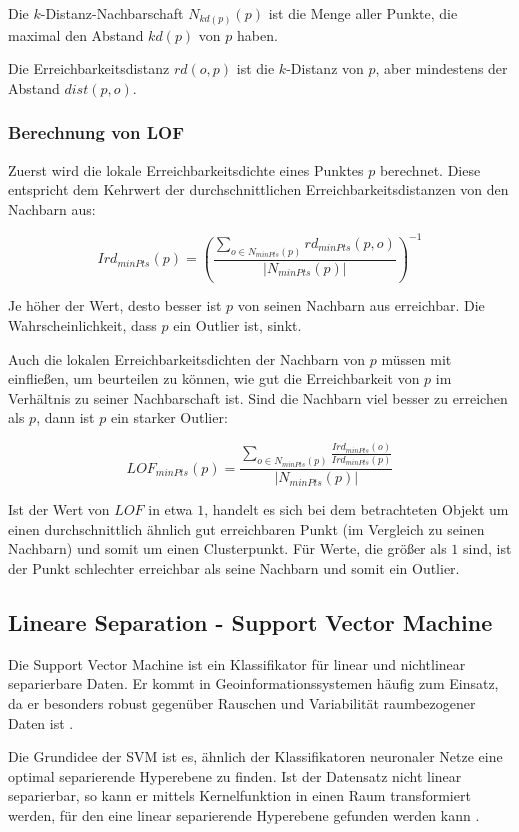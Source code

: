 \documentclass[11pt,ceqn]{book}
\begin{document}
Die $k$-Distanz-Nachbarschaft $N_{kd(p)} (p)$ ist die Menge aller Punkte, die maximal den Abstand $kd(p)$ von $p$ haben.

Die Erreichbarkeitsdistanz $rd(o,p)$ ist die $k$-Distanz von $p$, aber mindestens der Abstand $dist(p,o)$.

\subsubsection{Berechnung von LOF}

Zuerst wird die lokale Erreichbarkeitsdichte eines Punktes $p$ berechnet. Diese entspricht dem Kehrwert der durchschnittlichen Erreichbarkeitsdistanzen von den Nachbarn aus:

$$Ird_{minPts}(p) = \left(\frac{\sum\limits_{o \in N_{minPts}(p)} rd_{minPts}(p,o)}{|N_{minPts}(p)|}\right)^{-1}$$

Je höher der Wert, desto besser ist $p$ von seinen Nachbarn aus erreichbar. Die Wahrscheinlichkeit, dass $p$ ein Outlier ist, sinkt.

Auch die lokalen Erreichbarkeitsdichten der Nachbarn von $p$ müssen mit einfließen, um beurteilen zu können, wie gut die Erreichbarkeit von $p$ im Verhältnis zu seiner Nachbarschaft ist. Sind die Nachbarn viel besser zu erreichen als $p$, dann ist $p$ ein starker Outlier:

$$LOF_{minPts}(p) = \frac{\sum\limits_{o \in N_{minPts}(p)}\frac{Ird_{minPts}(o)}{Ird_{minPts}(p)}}{|N_{minPts}(p)|}$$

Ist der Wert von $LOF$ in etwa $1$, handelt es sich bei dem betrachteten Objekt um einen durchschnittlich ähnlich gut erreichbaren Punkt (im Vergleich zu seinen Nachbarn) und somit um einen Clusterpunkt. Für Werte, die größer als $1$ sind, ist der Punkt schlechter erreichbar als seine Nachbarn und somit ein Outlier.

\subsection{Lineare Separation - Support Vector Machine}
Die Support Vector Machine ist ein Klassifikator für linear und nichtlinear separierbare Daten. Er kommt in Geoinformationssystemen häufig zum Einsatz, da er besonders robust gegenüber Rauschen und Variabilität raumbezogener Daten ist \cite{svmingeo}.

Die Grundidee der SVM ist es, ähnlich der Klassifikatoren neuronaler Netze eine optimal separierende Hyperebene zu finden. Ist der Datensatz nicht linear separierbar, so kann er mittels Kernelfunktion in einen Raum transformiert werden, für den eine linear separierende Hyperebene gefunden werden kann \cite{svm}. \\
\end{document}
